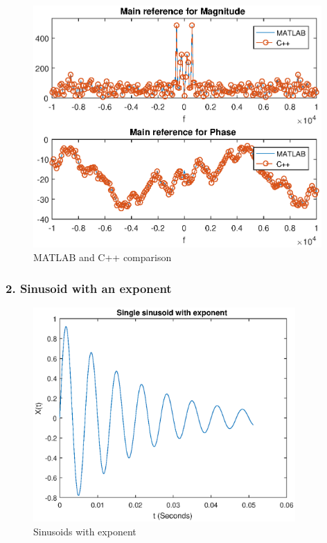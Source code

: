 \begin{figure}[h]
	\centering
	\includegraphics[width=11cm]{./algorithms/fft/figures/random_noise_fft.eps}
	\caption{MATLAB and C++ comparison}\label{random_noise_fft}
\end{figure}

\newpage
\subsubsection{2. Sinusoid with an exponent}

\begin{figure}[h]
	\centering
	\includegraphics[width=10cm]{./algorithms/fft/figures/Single_sinusoid.eps}
	\caption{Sinusoids with exponent}\label{Single_sinusoid}
\end{figure}

